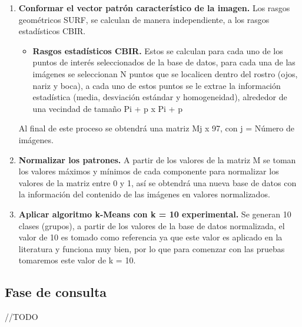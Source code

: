 \begin{enumerate}
\begin{enumerate}
		\item \textbf{Extracci\'on de los rasgos estad\'isticos.} Los rasgos estad\'isticos son generados para cada uno de los puntos de inter\'es, de cada una de las capas del espacio de color HSI. A partir de un punto de inter\'es determinado en un pixel se genera una ventana p de tama\~no {Pi + p x Pi + p} p\'ixeles con el punto de inter\'es en el centro, dentro de esta ventana (vecindad) se extraer\'an tres valores de informaci\'on estad\'istica: media, desviaci\'on est\'andar y homogeneidad, por lo que al final obtendremos N puntos de inter\'es, 3 valores estad\'isticos para cada vecindad del punto de inter\'es y 3 capas por imagen, tendremos {N x 3 x 3} valores estad\'isticos de la imagen en cuesti\'on.
	\end{enumerate}
	\item \textbf{Conformar el vector patr\'on caracter\'istico de la imagen.} Los rasgos geom\'etricos SURF, se calculan de manera independiente, a los rasgos estad\'isticos CBIR.
		\begin{itemize}
			\item \textbf{Rasgos estad\'isticos CBIR.} Estos se calculan para cada uno de los puntos de inter\'es seleccionados de la base de datos, para cada una de las im\'agenes se seleccionan N puntos que se localicen dentro del rostro (ojos, nariz y boca), a cada uno de estos puntos se le extrae la informaci\'on estad\'istica (media, desviaci\'on est\'andar y homogeneidad), alrededor de una vecindad de tama\~no {Pi + p x Pi + p}
		\end{itemize}
		Al final de este proceso se obtendr\'a una matriz {Mj x 97}, con j = N\'umero de im\'agenes.
	\item \textbf{Normalizar los patrones.} A partir de los valores de la matriz M se toman los valores m\'aximos y m\'inimos de cada componente para normalizar los valores de la matriz entre 0 y 1, as\'i se obtendr\'a una nueva base de datos con la informaci\'on del contenido de las im\'agenes en valores normalizados.
	\item \textbf{Aplicar algoritmo k-Means con k = 10 experimental.} Se generan 10 clases (grupos), a partir de los valores de la base de datos normalizada, el valor de 10 es tomado como referencia ya que este valor es aplicado en la literatura y funciona muy bien, por lo que para comenzar con las pruebas tomaremos este valor de k = 10.
\end{enumerate}

\subsection{Fase de consulta}
//TODO







